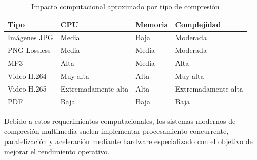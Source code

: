 \documentclass[12pt, oneside, letterpaper]{book}
\begin{document}
\begin{table}[H]
\centering
\caption{Impacto computacional aproximado por tipo de compresión}
\label{tab:impacto_compresion}
\renewcommand{\arraystretch}{1.4}
\begin{tabularx}{\textwidth}{|p{3cm}|p{3cm}|p{3cm}|X|}
\hline
\textbf{Tipo} & \textbf{CPU} & \textbf{Memoria} & \textbf{Complejidad} \\
\hline

Imágenes JPG & Media & Baja & Moderada \\
\hline

PNG Lossless & Media & Media & Moderada \\
\hline

MP3 & Alta & Media & Alta \\
\hline

Video H.264 & Muy alta & Alta & Muy alta \\
\hline

Video H.265 & Extremadamente alta & Alta & Extremadamente alta \\
\hline

PDF & Baja & Baja & Baja \\
\hline

\end{tabularx}
\end{table}

Debido a estos requerimientos computacionales, los sistemas modernos de compresión multimedia suelen implementar procesamiento concurrente, paralelización y aceleración mediante hardware especializado con el objetivo de mejorar el rendimiento operativo.
\end{document}
